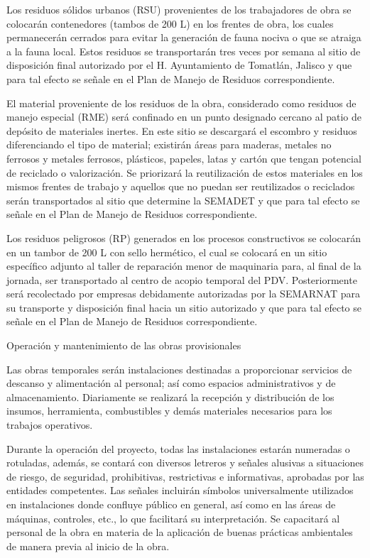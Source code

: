 \documentclass{article}
\begin{document}
Los residuos sólidos urbanos (RSU) provenientes de los trabajadores de obra se colocarán contenedores (tambos de 200 L) en los frentes de obra, los cuales permanecerán cerrados para evitar la generación de fauna nociva o que se atraiga a la fauna local. Estos residuos se transportarán tres veces por semana al sitio de disposición final autorizado por el H. Ayuntamiento de Tomatlán, Jalisco y que para tal efecto se señale en el Plan de Manejo de Residuos correspondiente. 

El material proveniente de los residuos de la obra, considerado como residuos de manejo especial (RME) será confinado en un punto designado cercano al patio de depósito de materiales inertes. En este sitio se descargará el escombro y residuos diferenciando el tipo de material; existirán áreas para maderas, metales no ferrosos y metales ferrosos, plásticos, papeles, latas y cartón que tengan potencial de reciclado o valorización. Se priorizará la reutilización de estos materiales en los mismos frentes de trabajo y aquellos que no puedan ser reutilizados o reciclados serán transportados al sitio que determine la SEMADET y que para tal efecto se señale en el Plan de Manejo de Residuos correspondiente.

Los residuos peligrosos (RP) generados en los procesos constructivos se colocarán en un tambor de 200 L con sello hermético, el cual se colocará en un sitio específico adjunto al taller de reparación menor de maquinaria para, al final de la jornada, ser transportado al centro de acopio temporal del PDV. Posteriormente será recolectado por empresas debidamente autorizadas por la SEMARNAT para su transporte y disposición final hacia un sitio autorizado y que para tal efecto se señale en el Plan de Manejo de Residuos correspondiente. 


\bigskip


\bigskip

Operación y mantenimiento de las obras provisionales


\bigskip

Las obras temporales serán instalaciones destinadas a proporcionar servicios de descanso y alimentación al personal; así como espacios administrativos y de almacenamiento. Diariamente se realizará la recepción y distribución de los insumos, herramienta, combustibles y demás materiales necesarios para los trabajos operativos. 

Durante la operación del proyecto, todas las instalaciones estarán numeradas o rotuladas, además, se contará con diversos letreros y señales alusivas a situaciones de riesgo, de seguridad, prohibitivas, restrictivas e informativas, aprobadas por las entidades competentes. Las señales incluirán símbolos universalmente utilizados en instalaciones donde confluye público en general, así como en las áreas de máquinas, controles, etc., lo que facilitará su interpretación. Se capacitará al personal de la obra en materia de la aplicación de buenas prácticas ambientales de manera previa al inicio de la obra. 
\end{document}
